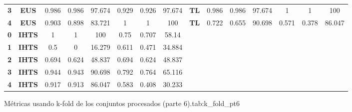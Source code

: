 {{\begin{tabular}{c|c|cccccc|ccccccc}
\textbf{3} & \textbf{EUS} & 0.986 & 0.986 & 97.674 & 0.929 & 0.926 & 97.674 & \multicolumn{1}{c|}{\textbf{TL}} & 0.986 & 0.986 & 97.674 & 1     & 1     & 100 \\
\textbf{4} & \textbf{EUS} & 0.903 & 0.898 & 83.721 & 1     & 1     & 100   & \multicolumn{1}{c|}{\textbf{TL}} & 0.722 & 0.655 & 90.698 & 0.571 & 0.378 & 86.047 \\
\textbf{0} & \textbf{IHTS} & 1     & 1     & 100   & 0.75  & 0.707 & 58.14 &       &       &       &       &       &       &  \\
\textbf{1} & \textbf{IHTS} & 0.5   & 0     & 16.279 & 0.611 & 0.471 & 34.884 &       &       &       &       &       &       &  \\
\textbf{2} & \textbf{IHTS} & 0.694 & 0.624 & 48.837 & 0.694 & 0.624 & 48.837 &       &       &       &       &       &       &  \\
\textbf{3} & \textbf{IHTS} & 0.944 & 0.943 & 90.698 & 0.792 & 0.764 & 65.116 &       &       &       &       &       &       &  \\
\textbf{4} & \textbf{IHTS} & 0.917 & 0.913 & 86.047 & 0.583 & 0.408 & 30.233 &       &       &       &       &       &       &  \\
\end{tabular}}}{Métricas usando k-fold de los conjuntos procesados (parte 6).}{tab:k_fold_pt6}

